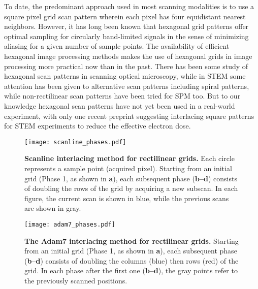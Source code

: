 \documentclass[aip, amsmath, amssymb, nobibnotes, nofootinbib, citeautoscript, reprint, superscriptaddress]{revtex4-2}
\begin{document}
    To date, the predominant approach used in most scanning modalities is to use a square pixel grid scan pattern wherein each pixel has four equidistant nearest neighbors.
    However, it has long been known that hexagonal grid patterns offer optimal sampling for circularly band-limited signals in the sense of minimizing aliasing for a given number of sample points\cite{petersen1962}.
    The availability of efficient hexagonal image processing methods makes the use of hexagonal grids in image processing more practical now than in the past\cite{hex_fft, middleton2006hexagonal}.
    There has been some study of hexagonal scan patterns in scanning optical microscopy\cite{heintzmann2007}, while in STEM some attention has been given to alternative scan patterns including spiral patterns\cite{spiral_scans}, while non-rectilinear scan patterns have been tried for SPM too\cite{non_gridded_spm}. 
    But to our knowledge hexagonal scan patterns have not yet been used in a real-world experiment, with only one recent preprint suggesting interlacing square patterns for STEM experiments to reduce the effective electron dose\cite{interlacing}.  

    \begin{figure}
        \texttt{[image: scanline\_phases.pdf]}
            \caption{
                \label{fig:scanlinephases}
                \textbf{Scanline interlacing method for rectilinear grids.}
                Each circle represents a sample point (acquired pixel).
                Starting from an initial grid (Phase 1, as shown in \textbf{a}), each subsequent phase (\textbf{b--d}) consists of
                doubling the rows of the grid by acquiring a new subscan. 
                In each figure, the current scan is shown in blue, while the previous scans are shown in gray.
                }
    \end{figure}

    \begin{figure}
        \texttt{[image: adam7\_phases.pdf]}
            \caption{
                \label{fig:adam7phases}
                \textbf{The Adam7 interlacing method for rectilinear grids.}
                Starting from an initial grid (Phase 1, as shown in \textbf{a}), each subsequent phase (\textbf{b--d}) consists of doubling the columns (blue) then rows (red) of the grid. 
                In each phase after the first one (\textbf{b--d}), the gray points refer to the previously scanned positions.
            }
    \end{figure}
    
\end{document}
